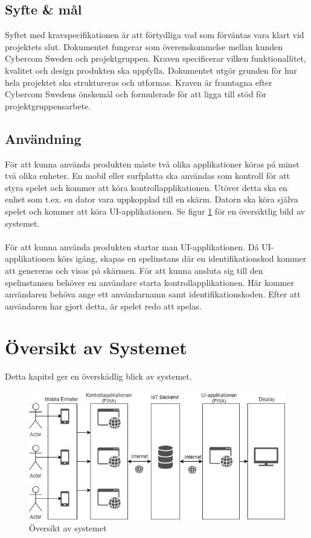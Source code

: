 \documentclass[10pt]{article}
\begin{document}
	\subsection{Syfte \& mål}
	Syftet med kravspecifikationen är att förtydliga vad som förväntas vara klart vid projektets slut. Dokumentet fungerar som överenskommelse mellan kunden Cybercom Sweden och projektgruppen. Kraven specificerar vilken funktionallitet, kvalitet och design produkten ska uppfylla. Dokumentet utgör grunden för hur hela projektet ska struktureras och utformas. Kraven är framtagna efter Cybercom Swedens önskemål och formulerade för att ligga till stöd för projektgruppensarbete.
	
	\subsection{Användning}
		För att kunna använda produkten måste två olika applikationer köras på minst två olika enheter. En mobil eller surfplatta ska användas som kontroll för att styra spelet och kommer att köra kontrollapplikationen. Utöver detta ska en enhet som t.ex. en dator vara uppkopplad till en skärm. Datorn ska köra själva spelet och kommer att köra UI-applikationen. Se figur \ref{fig:overview} för en översiktlig bild av systemet. \\
\\
För att kunna använda produkten startar man UI-applikationen. Då UI-applikationen körs igång, skapas en spelinstans där en identifikationskod kommer att genereras och visas på skärmen. För att kunna ansluta sig till den spelinstansen behöver en användare starta kontrollapplikationen. Här kommer användaren behöva ange ett användarnamn samt identifikationskoden. Efter att användaren har gjort detta, är spelet redo att spelas.

\pagebreak

\section{Översikt av Systemet}
	Detta kapitel ger en överskådlig blick av systemet.
	
	\begin{figure}[h]
		\centering
		\includegraphics[scale=0.8]{overview}
		\caption{Översikt av systemet}
		\label{fig:overview}
	\end{figure}
\end{document}
